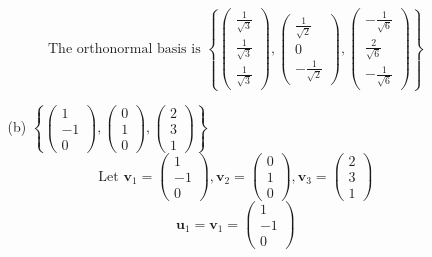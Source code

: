 \documentclass[a3paper,12pt]{extarticle} %
\begin{document}
\begin{enumerate}
\begin{enumerate}
\[        \]
        \[
            \text{The orthonormal basis is } \left\{ \begin{pmatrix} \frac{1}{\sqrt{3}} \\ \frac{1}{\sqrt{3}} \\ \frac{1}{\sqrt{3}} \end{pmatrix}, \begin{pmatrix} \frac{1}{\sqrt{2}} \\ 0 \\ -\frac{1}{\sqrt{2}} \end{pmatrix}, \begin{pmatrix} -\frac{1}{\sqrt{6}} \\ \frac{2}{\sqrt{6}} \\ -\frac{1}{\sqrt{6}} \end{pmatrix} \right\}
        \]
        \item[(b)] \(\left\{ \begin{pmatrix} 1 \\ -1 \\ 0 \end{pmatrix}, \begin{pmatrix} 0 \\ 1 \\ 0 \end{pmatrix}, \begin{pmatrix} 2 \\ 3 \\ 1 \end{pmatrix} \right\}\)
        \[
            \text{Let } \mathbf{v}_1 = \begin{pmatrix} 1 \\ -1 \\ 0 \end{pmatrix}, \mathbf{v}_2 = \begin{pmatrix} 0 \\ 1 \\ 0 \end{pmatrix}, \mathbf{v}_3 = \begin{pmatrix} 2 \\ 3 \\ 1 \end{pmatrix}
        \]
        \[
            \mathbf{u}_1 = \mathbf{v}_1 = \begin{pmatrix} 1 \\ -1 \\ 0 \end{pmatrix}
        \]
        \[
\]
\end{enumerate}
\end{enumerate}
\end{document}

